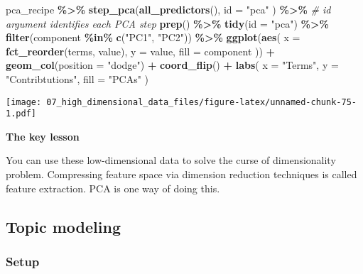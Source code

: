 \documentclass[
]{book}
\newenvironment{Shaded}{\begin{snugshade}}{\end{snugshade}}
\newcommand{\CommentTok}[1]{\textcolor[rgb]{0.56,0.35,0.01}{\textit{#1}}}
\newcommand{\DataTypeTok}[1]{\textcolor[rgb]{0.13,0.29,0.53}{#1}}
\newcommand{\KeywordTok}[1]{\textcolor[rgb]{0.13,0.29,0.53}{\textbf{#1}}}
\newcommand{\NormalTok}[1]{#1}
\newcommand{\OperatorTok}[1]{\textcolor[rgb]{0.81,0.36,0.00}{\textbf{#1}}}
\newcommand{\StringTok}[1]{\textcolor[rgb]{0.31,0.60,0.02}{#1}}
\begin{document}
\begin{Shaded}
\begin{Highlighting}[]
\NormalTok{pca\_recipe }\OperatorTok{\%\textgreater{}\%}
\StringTok{  }\KeywordTok{step\_pca}\NormalTok{(}\KeywordTok{all\_predictors}\NormalTok{(),}
    \DataTypeTok{id =} \StringTok{"pca"}
\NormalTok{  ) }\OperatorTok{\%\textgreater{}\%}\StringTok{ }\CommentTok{\# id argument identifies each PCA step}
\StringTok{  }\KeywordTok{prep}\NormalTok{() }\OperatorTok{\%\textgreater{}\%}
\StringTok{  }\KeywordTok{tidy}\NormalTok{(}\DataTypeTok{id =} \StringTok{"pca"}\NormalTok{) }\OperatorTok{\%\textgreater{}\%}
\StringTok{  }\KeywordTok{filter}\NormalTok{(component }\OperatorTok{\%in\%}\StringTok{ }\KeywordTok{c}\NormalTok{(}\StringTok{"PC1"}\NormalTok{, }\StringTok{"PC2"}\NormalTok{)) }\OperatorTok{\%\textgreater{}\%}
\StringTok{  }\KeywordTok{ggplot}\NormalTok{(}\KeywordTok{aes}\NormalTok{(}
    \DataTypeTok{x =} \KeywordTok{fct\_reorder}\NormalTok{(terms, value), }\DataTypeTok{y =}\NormalTok{ value,}
    \DataTypeTok{fill =}\NormalTok{ component}
\NormalTok{  )) }\OperatorTok{+}
\StringTok{  }\KeywordTok{geom\_col}\NormalTok{(}\DataTypeTok{position =} \StringTok{"dodge"}\NormalTok{) }\OperatorTok{+}
\StringTok{  }\KeywordTok{coord\_flip}\NormalTok{() }\OperatorTok{+}
\StringTok{  }\KeywordTok{labs}\NormalTok{(}
    \DataTypeTok{x =} \StringTok{"Terms"}\NormalTok{,}
    \DataTypeTok{y =} \StringTok{"Contribtutions"}\NormalTok{,}
    \DataTypeTok{fill =} \StringTok{"PCAs"}
\NormalTok{  )}
\end{Highlighting}
\end{Shaded}

\texttt{[image: 07\_high\_dimensional\_data\_files/figure-latex/unnamed-chunk-75-1.pdf]}

\textbf{The key lesson}

You can use these low-dimensional data to solve the curse of dimensionality problem. Compressing feature space via dimension reduction techniques is called feature extraction. PCA is one way of doing this.

\hypertarget{topic-modeling}{%
\subsection{Topic modeling}\label{topic-modeling}}

\hypertarget{setup-6}{%
\subsubsection{Setup}\label{setup-6}}
\end{document}
